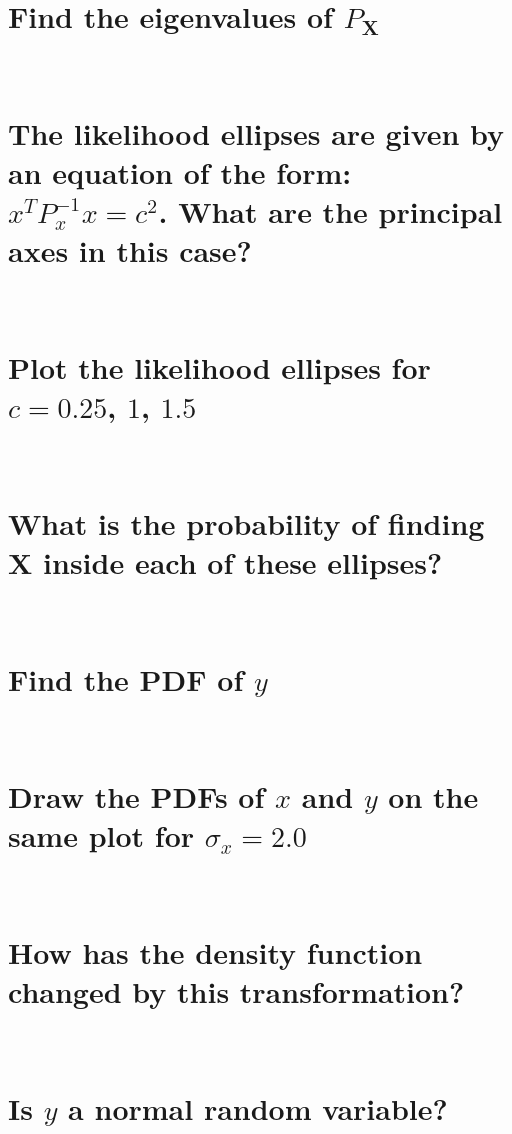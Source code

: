 \documentclass[12pt,letterpaper, onecolumn]{exam}
\begin{document}
\begin{questions}
\begin{parts}
		\part{Find the eigenvalues of $P_{\mathbf{X}}$}\\
		\solution
		\part{The likelihood ellipses are given by an equation of the form: $x^T P^{-1}_x x = c^2$. What are the principal axes in this case?}\\
		\solution
		\part{Plot the likelihood ellipses for $c = 0.25$, $1$, $1.5$}\\
		\solution
		\part{What is the probability of finding $\mathbf{X}$ inside each of these ellipses?}\\
		\solution
	\end{parts}
	\clearpage
	\begin{parts}
		\part{Find the PDF of $y$}\\
		\solution
		\part{Draw the PDFs of $x$ and $y$ on the same plot for $\sigma_x = 2.0$}\\
		\solution
		\part{How has the density function changed by this transformation?}\\
		\solution
		\part{Is $y$ a normal random variable?}\\
		\solution
	\end{parts}
\end{questions}
\end{document}
